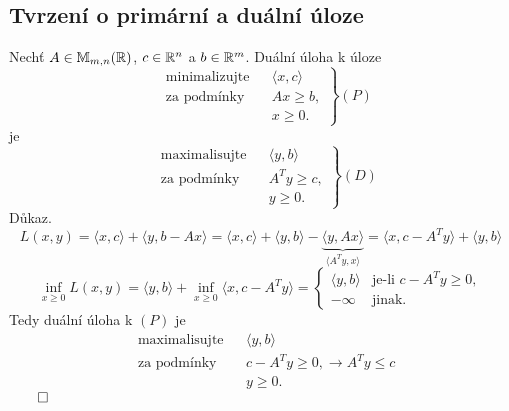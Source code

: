 \subsection{Tvrzení o primární a duální úloze}
Nechť $A \in \mathbb{M}_{m,n}(\mathbb{R})$, $c \in \mathbb{R}^n$ a $b \in \mathbb{R}^m$. Duální úloha k úloze
\[
\left.\begin{aligned}
    &\text{minimalizujte}&& \langle x, c \rangle \\
    &\text{za podmínky}  && Ax \geq b, \\
    &                    && x \geq 0.
\end{aligned}
\right\} (P)
\]
je
\[
\left.\begin{aligned}
    &\text{maximalisujte}&& \langle y,b \rangle \\
    &\text{za podmínky}  && A^Ty \geq c, \\
    &                    && y \geq 0.
\end{aligned}
\right\} (D)
\]
Důkaz. 
\[
    L(x, y) = \langle x, c\rangle + \langle y, b- Ax\rangle = \langle x, c\rangle + \langle y, b\rangle - 
    \underbrace{\langle y, Ax\rangle}_{\langle A^Ty, x\rangle} = \langle x, c-A^Ty\rangle + \langle y, b\rangle
\]
\[
    \inf_{x\geq 0} L(x, y) = \langle y, b\rangle + \inf_{x\geq 0} \langle x, c-A^Ty\rangle =
    \begin{cases}
        \langle y, b\rangle & \text{je-li } c-A^Ty \geq 0, \\
        - \infty & \text{jinak.}
    \end{cases}
\]
Tedy duální úloha k $(P)$ je 
\[
\begin{aligned}
    &\text{maximalisujte}&& \langle y,b \rangle \\
    &\text{za podmínky}  && c-A^T y \geq 0, \rightarrow A^T y \leq c \\
    &                    && y \geq 0.
\end{aligned}
\]
$\qed$

